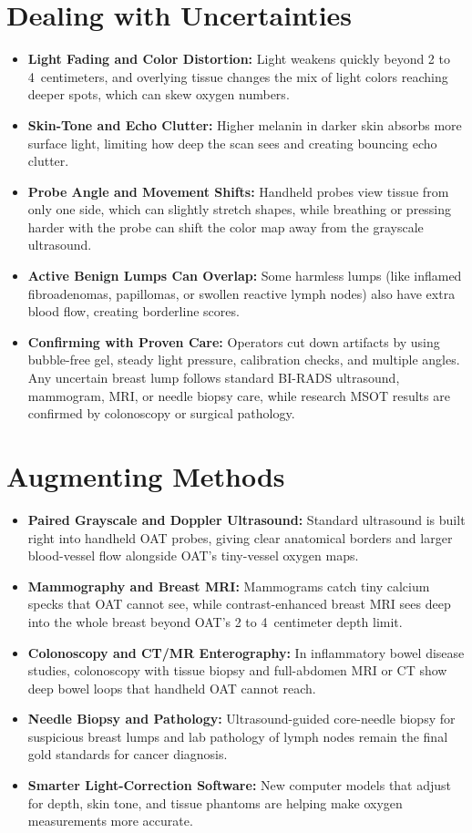 \section{Dealing with Uncertainties}
\begin{itemize}
  \item \textbf{Light Fading and Color Distortion:} Light weakens quickly beyond 2 to 4~centimeters, and overlying tissue changes the mix of light colors reaching deeper spots, which can skew oxygen numbers.
  \item \textbf{Skin-Tone and Echo Clutter:} Higher melanin in darker skin absorbs more surface light, limiting how deep the scan sees and creating bouncing echo clutter.
  \item \textbf{Probe Angle and Movement Shifts:} Handheld probes view tissue from only one side, which can slightly stretch shapes, while breathing or pressing harder with the probe can shift the color map away from the grayscale ultrasound.
  \item \textbf{Active Benign Lumps Can Overlap:} Some harmless lumps (like inflamed fibroadenomas, papillomas, or swollen reactive lymph nodes) also have extra blood flow, creating borderline scores.
  \item \textbf{Confirming with Proven Care:} Operators cut down artifacts by using bubble-free gel, steady light pressure, calibration checks, and multiple angles. Any uncertain breast lump follows standard BI-RADS ultrasound, mammogram, MRI, or needle biopsy care, while research MSOT results are confirmed by colonoscopy or surgical pathology.
\end{itemize}

\section{Augmenting Methods}
\begin{itemize}
  \item \textbf{Paired Grayscale and Doppler Ultrasound:} Standard ultrasound is built right into handheld OAT probes, giving clear anatomical borders and larger blood-vessel flow alongside OAT's tiny-vessel oxygen maps.
  \item \textbf{Mammography and Breast MRI:} Mammograms catch tiny calcium specks that OAT cannot see, while contrast-enhanced breast MRI sees deep into the whole breast beyond OAT's 2 to 4~centimeter depth limit.
  \item \textbf{Colonoscopy and CT/MR Enterography:} In inflammatory bowel disease studies, colonoscopy with tissue biopsy and full-abdomen MRI or CT show deep bowel loops that handheld OAT cannot reach.
  \item \textbf{Needle Biopsy and Pathology:} Ultrasound-guided core-needle biopsy for suspicious breast lumps and lab pathology of lymph nodes remain the final gold standards for cancer diagnosis.
  \item \textbf{Smarter Light-Correction Software:} New computer models that adjust for depth, skin tone, and tissue phantoms are helping make oxygen measurements more accurate.
\end{itemize}

